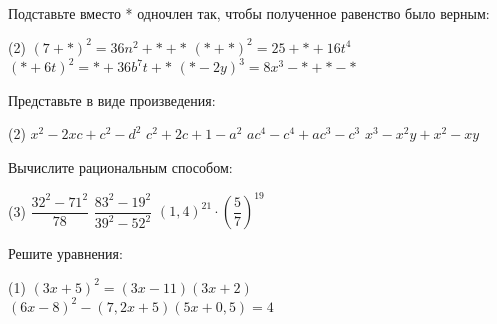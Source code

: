 \begin{exam}
	\begin{listofex}
		\item Подставьте вместо * одночлен так, чтобы полученное равенство было верным:
		\begin{tasks}(2)
			\task \( (7+*)^2=36n^2+*+* \)
			\task \( (*+*)^2=25+*+16t^4 \)
			\task \( (*+6t)^2=*+36b^7t+* \)
			\task \( (*-2y)^3=8x^3-*+*-* \)
		\end{tasks}
		
		\item Представьте в виде произведения:
		\begin{tasks}(2)
			\task \( x^2-2xc+c^2-d^2 \)
			\task \( c^2+2c+1-a^2 \)
			\task \( ac^4-c^4+ac^3-c^3 \)
			\task \( x^3-x^2y+x^2-xy \)
		\end{tasks}
		\item Вычислите рациональным способом:
		\begin{tasks}(3)
			\task \( \dfrac{32^2-71^2}{78}  \)
			\task \( \dfrac{83^2-19^2}{39^2-52^2} \)
			\task \( (1,4)^{21} \cdot \left( \dfrac{5}{7} \right)^{19} \)
		\end{tasks}
		\item Решите уравнения:
		\begin{tasks}(1)
			\task \( (3x+5)^2= (3x-11)(3x+2) \)
			\task \( (6x-8)^2 - (7,2x+5)(5x+0,5)=4 \)
		\end{tasks}
	\end{listofex}
\end{exam}
